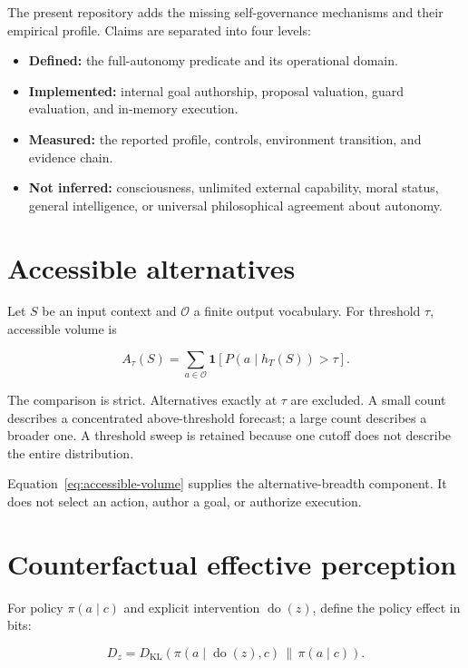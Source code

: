 \documentclass[11pt,a4paper]{article}
\begin{document}
The present repository adds the missing self-governance mechanisms and their empirical profile. Claims are separated into four levels:

\begin{itemize}[nosep]
  \item \textbf{Defined:} the full-autonomy predicate and its operational domain.
  \item \textbf{Implemented:} internal goal authorship, proposal valuation, guard evaluation, and in-memory execution.
  \item \textbf{Measured:} the reported profile, controls, environment transition, and evidence chain.
  \item \textbf{Not inferred:} consciousness, unlimited external capability, moral status, general intelligence, or universal philosophical agreement about autonomy.
\end{itemize}

\section{Accessible alternatives}
Let $S$ be an input context and $\mathcal O$ a finite output vocabulary. For threshold $\tau$, accessible volume is

\begin{equation}
A_\tau(S)=\sum_{a\in\mathcal O}\mathbf 1\!\left[P(a\mid h_T(S))>\tau\right].
\label{eq:accessible-volume}
\end{equation}

The comparison is strict. Alternatives exactly at $\tau$ are excluded. A small count describes a concentrated above-threshold forecast; a large count describes a broader one. A threshold sweep is retained because one cutoff does not describe the entire distribution.

Equation~\ref{eq:accessible-volume} supplies the alternative-breadth component. It does not select an action, author a goal, or authorize execution.

\section{Counterfactual effective perception}
For policy $\pi(a\mid c)$ and explicit intervention $\operatorname{do}(z)$, define the policy effect in bits:

\begin{equation}
D_z=D_{\mathrm{KL}}\!\left(
\pi(a\mid\operatorname{do}(z),c)\,\middle\|\,\pi(a\mid c)
\right).
\end{equation}
\end{document}
